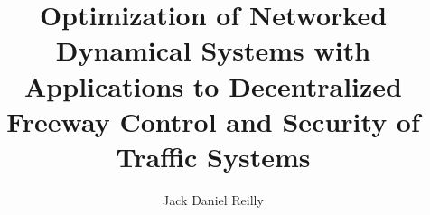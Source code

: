 \title{Optimization of Networked Dynamical Systems with Applications to Decentralized Freeway Control and Security of Traffic Systems}

\author{Jack Daniel Reilly}






\prevdegrees{}



\maketitle

\copyrightpage
\listoftodos

\begin{abstract}

\end{abstract}

\begin{frontmatter}
\renewcommand{\thepage}{\roman{page}}
\setcounter{page}{1}

\begin{dedication}
\null\vfil
{\large
\begin{center}

\end{center}}
\null\vfil
\end{dedication}

\tableofcontents
\listoffigures
\listoftables


\begin{acknowledgements}

\end{acknowledgements}

\clearpage

\end{frontmatter}